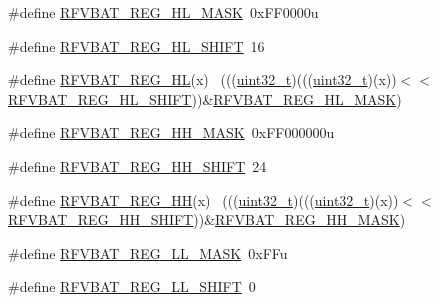 \begin{DoxyCompactItemize}
\item 
\#define \hyperlink{group___r_f_v_b_a_t___register___masks_gae0f69a55f5feaf1e41b317aaa17780fe}{R\+F\+V\+B\+A\+T\+\_\+\+R\+E\+G\+\_\+\+H\+L\+\_\+\+M\+A\+SK}~0x\+F\+F0000u
\item 
\#define \hyperlink{group___r_f_v_b_a_t___register___masks_ga069a18ff685d5c1e8e48acc77454bf70}{R\+F\+V\+B\+A\+T\+\_\+\+R\+E\+G\+\_\+\+H\+L\+\_\+\+S\+H\+I\+FT}~16
\item 
\#define \hyperlink{group___r_f_v_b_a_t___register___masks_gae16222d2b2ede79d199afaa5da47f0f5}{R\+F\+V\+B\+A\+T\+\_\+\+R\+E\+G\+\_\+\+HL}(x)                                              ~(((\hyperlink{_p_e___types_8h_a33594304e786b158f3fb30289278f5af}{uint32\+\_\+t})(((\hyperlink{_p_e___types_8h_a33594304e786b158f3fb30289278f5af}{uint32\+\_\+t})(x))$<$$<$\hyperlink{group___r_f_v_b_a_t___register___masks_ga069a18ff685d5c1e8e48acc77454bf70}{R\+F\+V\+B\+A\+T\+\_\+\+R\+E\+G\+\_\+\+H\+L\+\_\+\+S\+H\+I\+FT}))\&\hyperlink{group___r_f_v_b_a_t___register___masks_gae0f69a55f5feaf1e41b317aaa17780fe}{R\+F\+V\+B\+A\+T\+\_\+\+R\+E\+G\+\_\+\+H\+L\+\_\+\+M\+A\+SK})
\item 
\#define \hyperlink{group___r_f_v_b_a_t___register___masks_gad2932f13b6d26fa7ccb982b9cffcd184}{R\+F\+V\+B\+A\+T\+\_\+\+R\+E\+G\+\_\+\+H\+H\+\_\+\+M\+A\+SK}~0x\+F\+F000000u
\item 
\#define \hyperlink{group___r_f_v_b_a_t___register___masks_gae67376345507e381e7f56f8bae49359c}{R\+F\+V\+B\+A\+T\+\_\+\+R\+E\+G\+\_\+\+H\+H\+\_\+\+S\+H\+I\+FT}~24
\item 
\#define \hyperlink{group___r_f_v_b_a_t___register___masks_gadfc5bbcb901243c01dd0233b4ca94eb7}{R\+F\+V\+B\+A\+T\+\_\+\+R\+E\+G\+\_\+\+HH}(x)                                              ~(((\hyperlink{_p_e___types_8h_a33594304e786b158f3fb30289278f5af}{uint32\+\_\+t})(((\hyperlink{_p_e___types_8h_a33594304e786b158f3fb30289278f5af}{uint32\+\_\+t})(x))$<$$<$\hyperlink{group___r_f_v_b_a_t___register___masks_gae67376345507e381e7f56f8bae49359c}{R\+F\+V\+B\+A\+T\+\_\+\+R\+E\+G\+\_\+\+H\+H\+\_\+\+S\+H\+I\+FT}))\&\hyperlink{group___r_f_v_b_a_t___register___masks_gad2932f13b6d26fa7ccb982b9cffcd184}{R\+F\+V\+B\+A\+T\+\_\+\+R\+E\+G\+\_\+\+H\+H\+\_\+\+M\+A\+SK})
\item 
\#define \hyperlink{group___r_f_v_b_a_t___register___masks_gac055aaeebf0ff5200e7b3703d6a6ed73}{R\+F\+V\+B\+A\+T\+\_\+\+R\+E\+G\+\_\+\+L\+L\+\_\+\+M\+A\+SK}~0x\+F\+Fu
\item 
\#define \hyperlink{group___r_f_v_b_a_t___register___masks_ga77fdef5edef0e9e20236761366ed3fbb}{R\+F\+V\+B\+A\+T\+\_\+\+R\+E\+G\+\_\+\+L\+L\+\_\+\+S\+H\+I\+FT}~0

\end{DoxyCompactItemize}
